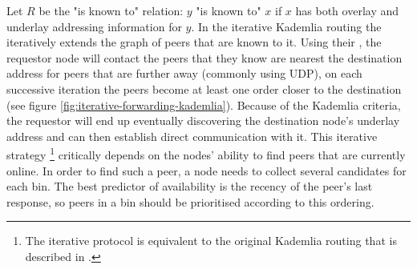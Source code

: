 Let $R$ be the "is known to" relation:  $y$ "is known to" $x$ if $x$ has both overlay and underlay addressing information for $y$. 
In the iterative Kademlia routing the  iteratively extends the graph of peers that are known to it. Using their , the requestor node will contact the peers that they know are nearest the destination address for peers that are further away (commonly using UDP), on each successive iteration the peers become at least one order closer to the destination (see figure \ref{fig:iterative-forwarding-kademlia}). Because of the Kademlia criteria, the requestor will end up eventually discovering the destination node's underlay address and can then establish direct communication with it. This iterative strategy%
%
\footnote{The iterative protocol is equivalent to the original Kademlia routing that is described in \cite{maymounkov2002kademlia}.
}
%
critically depends on the nodes' ability to find peers that are currently online. In order to find such a peer, a node needs to collect several candidates for each bin. The best predictor of availability is the recency of the peer's last response, so peers in a bin should be prioritised according to this ordering.

